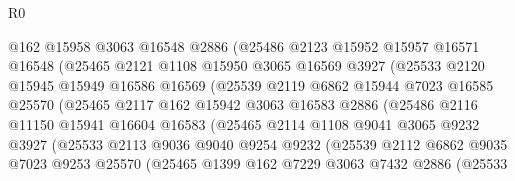 \begin{lexlean}{R0}
\begin{coremodule}
                    @162
                    @15958
                    @3063
                    @16548
                    @2886
                    (@25486
                      @2123
                      @15952
                      @15957
                      @16571
                      @16548
                      (@25465
                        @2121
                        @1108
                        @15950
                        @3065
                        @16569
                        @3927
                        (@25533
                          @2120
                          @15945
                          @15949
                          @16586
                          @16569
                          (@25539
                            @2119
                            @6862
                            @15944
                            @7023
                            @16585
                            @25570
                            (@25465
                              @2117
                              @162
                              @15942
                              @3063
                              @16583
                              @2886
                              (@25486
                                @2116
                                @11150
                                @15941
                                @16604
                                @16583
                                (@25465
                                  @2114
                                  @1108
                                  @9041
                                  @3065
                                  @9232
                                  @3927
                                  (@25533
                                    @2113
                                    @9036
                                    @9040
                                    @9254
                                    @9232
                                    (@25539
                                      @2112
                                      @6862
                                      @9035
                                      @7023
                                      @9253
                                      @25570
                                      (@25465
                                        @1399
                                        @162
                                        @7229
                                        @3063
                                        @7432
                                        @2886
                                        (@25533

\end{coremodule}
\end{lexlean}
